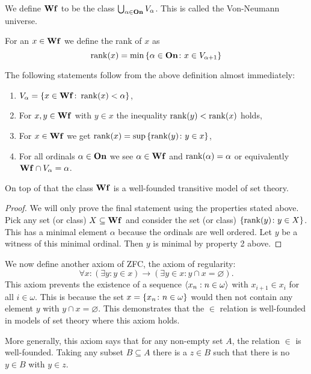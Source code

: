 \begin{definition}
    We define \({\bf Wf}\) to be the class
    \(\bigcup_{\alpha\in{\bf On}}V_{\alpha}\). This is called the Von-Neumann
    universe.

    For an \(x\in{\bf Wf}\) we define the rank of \(x\) as
    \[
        \operatorname{rank}(x)=\min\left\{\alpha\in{\bf On}\colon x\in V_{\alpha+1}\right\}
    \]
\end{definition}

\begin{proposition}
    \label{prop:wf-sets-props}
    The following statements follow from the above definition almost
    immediately:
    \begin{enumerate}
        \item \(V_{\alpha}=\left\{x\in{\bf Wf}\colon\operatorname{rank}(x)<\alpha\right\}\),
        \item For \(x,y\in{\bf Wf}\) with \(y\in x\) the inequality
              \(\operatorname{rank}(y)<\operatorname{rank}(x)\) holds,
        \item For \(x\in{\bf Wf}\) we get \(\operatorname{rank}(x)=\sup\left\{\operatorname{rank}(y)\colon y\in
                  x\right\}\),
        \item For all ordinals \(\alpha\in{\bf On}\) we see \(\alpha\in{\bf Wf}\)
              and \(\operatorname{rank}(\alpha)=\alpha\) or equivalently \({\bf Wf}\cap
              V_{\alpha}=\alpha\).
    \end{enumerate}
    On top of that the class \({\bf Wf}\) is a well-founded transitive model of set
    theory.

    \begin{proof}
        We will only prove the final statement using the properties stated
        above. Pick any set (or class) \(X\subseteq{\bf Wf}\) and consider the set
        (or class) \(\left\{\operatorname{rank}(y)\colon y\in X\right\}\). This has a minimal element
        \(\alpha\) because the ordinals are well ordered. Let \(y\) be a witness
        of this minimal ordinal. Then \(y\) is minimal by property 2 above.
    \end{proof}
\end{proposition}

\begin{definition}
    We now define another axiom of ZFC, the axiom of regularity:
    \[
        \forall x:(\exists y:y\in x)\to(\exists y\in x: y\cap x=\varnothing).
    \]
    This axiom prevents the existence of a sequence
    \(\left<x_{n}:n\in\omega\right>\) with \(x_{i+1}\in x_{i}\) for all
    \(i\in\omega\). This is because the set \(x=\left\{x_{n}\colon n\in\omega\right\}\)
    would then not contain any element \(y\) with \(y\cap x=\varnothing\). This
    demonstrates that the \(\in\) relation is well-founded in models of set
    theory where this axiom holds.

    More generally, this axiom says that for any non-empty set \(A\), the
    relation \(\in\) is well-founded. Taking any subset \(B\subseteq A\) there
    is a \(z\in B\) such that there is no \(y\in B\) with \(y\in z\).
\end{definition}

